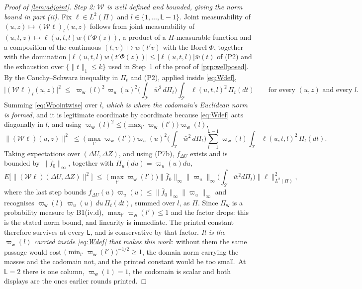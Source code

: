 \begin{proof}[Proof of \cref{lem:adjoint}]
\emph{Step 2: $\mathcal W$ is well defined and bounded, giving the norm bound in part (ii).}
Fix $\ell\in L^{2}(\Pi)$ and $l\in\{1,\dots,\mathsf L-1\}$. Joint measurability of
$(u,z)\mapsto(\mathcal W\ell)_l(u,z)$ follows from joint
measurability of $(u,t,z)\mapsto\ell(u,t,l)w(t'\Phi(z))$, a product of a $\Pi$-measurable function and a
composition of the continuous $(t,v)\mapsto w(t'v)$ with the Borel $\Phi$, together with the
domination $|\ell(u,t,l)w(t'\Phi(z))|\le|\ell(u,t,l)|\bar w(t)$ of (P2) and the exhaustion over
$\{\|t\|_1\le k\}$ used in Step~1 of the proof of \cref{prp:wellposed}. By the Cauchy--Schwarz inequality
in $\Pi_t$ and (P2), applied inside \eqref{eq:Wdef},
\begin{equation}\label{eq:Wpointwise}
\big|(\mathcal W\ell)_l(u,z)\big|^{2}
\;\le\;\varpi_{\mathsf w}(l)^{2}\,\varpi_u(u)^{2}\Big(\int_{\mathcal T}\bar w^{2}\,d\Pi_t\Big)\int_{\mathcal T}\ell(u,t,l)^{2}\,\Pi_t(dt)
\qquad\text{for every }(u,z)\text{ and every }l.
\end{equation}
Summing \eqref{eq:Wpointwise} over $l$, \emph{which is where the codomain's Euclidean norm is formed},
and it is legitimate coordinate by coordinate because \eqref{eq:Wdef} acts diagonally in $l$, and
using $\varpi_{\mathsf w}(l)^{2}\le\big(\max_{l'}\varpi_{\mathsf w}(l')\big)\varpi_{\mathsf w}(l)$,
\[
\big\|(\mathcal W\ell)(u,z)\big\|^{2}\;\le\;\Big(\max_{l'}\varpi_{\mathsf w}(l')\Big)\varpi_u(u)^{2}
\Big(\int_{\mathcal T}\bar w^{2}\,d\Pi_t\Big)\sum_{l=1}^{\mathsf L-1}\varpi_{\mathsf w}(l)\int_{\mathcal T}\ell(u,t,l)^{2}\,\Pi_t(dt).
\]
Taking expectations over $(\Delta U,\Delta Z)$, and using (P7b), $f_{\Delta U}$ exists and is bounded
by $\|\bar f_0\|_\infty$, together with $\Pi_u(du)=\varpi_u(u)du$,
\[
E\big[\big\|(\mathcal W\ell)(\Delta U,\Delta Z)\big\|^{2}\big]
\;\le\;\Big(\max_{l'}\varpi_{\mathsf w}(l')\Big)\|\bar f_0\|_\infty\|\varpi_u\|_\infty\Big(\!\int_{\mathcal T}\!\bar w^{2}d\Pi_t\Big)\|\ell\|^{2}_{L^{2}(\Pi)},
\]
where the last step bounds $f_{\Delta U}(u)\varpi_u(u)\le\|\bar f_0\|_\infty\|\varpi_u\|_\infty$ and
recognises $\varpi_{\mathsf w}(l)\,\varpi_u(u)\,du\,\Pi_t(dt)$, summed over $l$, as $\Pi$. Since
$\Pi_{\mathsf w}$ is a probability measure by B1(iv.d), $\max_{l'}\varpi_{\mathsf w}(l')\le1$ and the factor
drops: this is the stated norm bound, and linearity is
immediate. The printed constant therefore survives at every $\mathsf L$, and is conservative by
that factor. \emph{It is the $\varpi_{\mathsf w}(l)$ carried inside \eqref{eq:Wdef} that makes this
work}: without them the same passage would cost $\big(\min_{l'}\varpi_{\mathsf w}(l')\big)^{-1/2}\ge1$, the
domain norm carrying the masses and the codomain not, and the printed constant would be too small.
At $\mathsf L=2$ there is one column, $\varpi_{\mathsf w}(1)=1$, the codomain is scalar and both
displays are the ones earlier rounds printed.


\end{proof}
